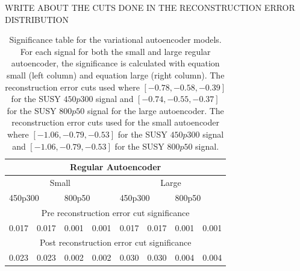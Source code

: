 WRITE ABOUT THE CUTS DONE IN THE RECONSTRUCTION ERROR DISTRIBUTION



\begin{table}[H]
    \centering
    \caption[Significance table variational autoencoder]{Significance table for the variational autoencoder models. For each signal for both the small and 
    large regular autoencoder, the significance is calculated with equation small (left column) and equation large (right column). The 
    reconstruction error cuts used where $[-0.78, -0.58, -0.39]$ for the SUSY $450p300$ signal and $[-0.74, -0.55, -0.37]$ for the SUSY 
    $800p50$ signal for the large autoencoder. The reconstruction error cuts used for the small autoencoder where $[-1.06, -0.79, -0.53]$ 
    for the SUSY $450p300$ signal and $[-1.06, -0.79, -0.53]$ for the SUSY $800p50$ signal. }
    \label{tab:VAE_2lep_significance}
    \begin{tabular}{|llllllll|}
    \hline
    \multicolumn{8}{|c|}{Regular Autoencoder}                                                                                                                                    \\ \hline
    \multicolumn{4}{|c|}{Small}                                                                    & \multicolumn{4}{c|}{Large}                                                  \\ \hline
    \multicolumn{2}{|l|}{450p300}                  & \multicolumn{2}{l|}{800p50}                   & \multicolumn{2}{l|}{450p300}                  & \multicolumn{2}{l|}{800p50} \\ \hline
    \multicolumn{8}{|c|}{Pre reconstruction error cut significance}                                                                                                                           \\ \hline
    \multicolumn{1}{|l|}{0.017} & \multicolumn{1}{l|}{0.017} & \multicolumn{1}{l|}{0.001} & \multicolumn{1}{l|}{0.001} & \multicolumn{1}{l|}{0.017} & \multicolumn{1}{l|}{0.017} & \multicolumn{1}{l|}{0.001}  & \multicolumn{1}{l|}{0.001} \\ \hline
    \multicolumn{8}{|c|}{Post reconstruction error  cut significance}                                                                                                                         \\ \hline
    \multicolumn{1}{|l|}{0.023} & \multicolumn{1}{l|}{0.023} & \multicolumn{1}{l|}{0.002} & \multicolumn{1}{l|}{0.002} & \multicolumn{1}{l|}{0.030} & \multicolumn{1}{l|}{0.030} & \multicolumn{1}{l|}{0.004}   & \multicolumn{1}{l|}{0.004}  \\ \hline

\end{tabular}
\end{table}
